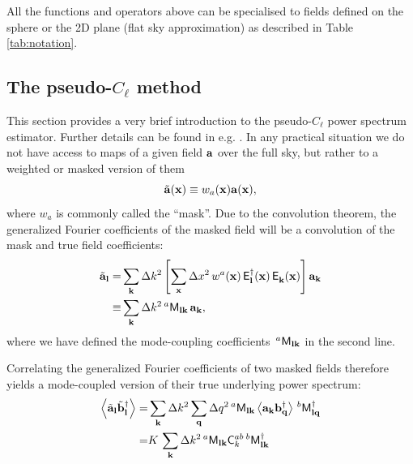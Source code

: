 \documentclass[a4paper,11pt]{article}
\newcommand{\summ}[1]{\sum_{\bf #1}\Delta #1^2}
\newcommand{\Ylm}[3]{{\sf E}^{#1}_{\bf #2}({\bf #3})}
\begin{document}
      All the functions and operators above can be specialised to fields defined on the sphere or the 2D plane (flat sky approximation) as described in Table \ref{tab:notation}.

    \subsection{The pseudo-$C_\ell$ method}\label{ssec:theory.pcl}
      This section provides a very brief introduction to the pseudo-$C_\ell$ power spectrum estimator. Further details can be found in e.g. \cite{2002ApJ...567....2H,2005MNRAS.360.1262B,2019MNRAS.484.4127A}. 
      In any practical situation we do not have access to maps of a given field ${\bf a}$ over the full sky, but rather to a weighted or masked version of them
      \begin{equation}
        \tilde{\bf a}({\bf x})\equiv w_a({\bf x}){\bf a}({\bf x}),
        \label{eq:mask}
      \end{equation}
      where $w_a$ is commonly called the ``mask''. Due to the convolution theorem, the generalized Fourier coefficients of the masked field will be a convolution of the mask and true field coefficients:
      \begin{align}\nonumber
        \tilde{\bf a}_{\bf l}=&\summ{k}\left[\summ{x}\,w^a({\bf x})\,\Ylm{\dag}{l}{x}\,\Ylm{}{k}{x}\right]{\bf a}_{\bf k}\\
                        \equiv&\summ{k}\,^a{\sf M}_{{\bf l}{\bf k}}\,{\bf a}_{\bf k},
      \end{align}
      where we have defined the mode-coupling coefficients $\,^a{\sf M}_{{\bf l}{\bf k}}$ in the second line.
    
      Correlating the generalized Fourier coefficients of two masked fields therefore yields a mode-coupled version of their true underlying power spectrum:
      \begin{align}\nonumber
        \left\langle\tilde{\bf a}_{\bf l}\tilde{\bf b}^\dag_{\bf l}\right\rangle=&\summ{k}\summ{q}\,^a{\sf M}_{{\bf l}{\bf k}}\left\langle{\bf a}_{\bf k}{\bf b}^\dag_{\bf q}\right\rangle\,^b{\sf M}^\dag_{{\bf l}{\bf q}}\\
                                                                              =&K\,\summ{k}\,^a{\sf M}_{{\bf l}{\bf k}}{\sf C}^{ab}_k\,^b{\sf M}^\dag_{{\bf l}{\bf k}} \label{eq:M}                                                                             
      \end{align}
    
\end{document}
